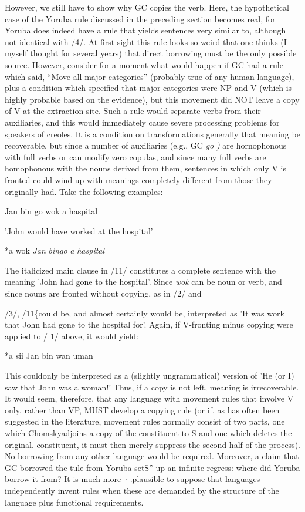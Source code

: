 However, we still have to show why GC copies the verb. Here, the hypothetical case of the Yoruba rule discussed in the preceding section becomes real, for Yoruba does indeed have a rule that yields sentences very similar to, although not identical with /4/. At first sight this rule looks so weird that one thinks (I myself thought for several years) that direct borrowing must be the only possible source. However, consider for a moment what would happen if GC had a rule which said, ``Move all major categories'' (probably true of any human lan\-guage), plus a condition which specified that major categories were NP and V (which is highly probable based on the evidence), but this movement did NOT leave a copy of V at the extraction site.
Such a rule would separate verbs from their auxiliaries, and this would immediately cause severe processing problems for speakers of creoles. It is a condition on transformations generally that meaning be recoverable, but since a number of auxiliaries (e.g., GC \textit{go} \textit{)} are hornoph\-onous with full verbs or can modify zero copulas, and since many full verbs are homophonous with the nouns derived from them, sentences in which only V is fronted could wind up with meanings completely different from those they originally had. Take the following examples:

\ea\label{ex:10}
 Jan bin go wok a haspital
\glt
\z

'John would have worked at the hospital'

\ea\label{ex:11}
 *a wok \textit{Jan} \textit{bi}\textit{n}\textit{go} \textit{a} \textit{haspital}
\glt
\z

The italicized main clause in /11/ constitutes a complete sentence with the meaning 'John had gone to the hospital'. Since \textit{wok} can be noun or verb, and since nouns are fronted without copying, as in /2/ and

/3/, /11\{could be, and almost certainly would be, interpreted as 'It was work that John had gone to the hospital for'. Again, if V-fronting minus copying were applied to / 1/ above, it would yield:

\ea\label{ex:12}
 *a sii Jan bin wan uman
\glt
\z

This couldonly be interpreted as a (slightly ungrammatical) version of 'He (or I) saw that John was a woman!' Thus, if a copy is not left, meaning is irrecoverable. It would seem, therefore, that any language with movement rules that involve V only, rather than VP, MUST de\-velop a copying rule (or if, as has often been suggested in the literature, movement rules normally consist of two parts, one which Chomsky\-adjoins a copy of the constituent to S and one which deletes the original. constituent, it must then merely suppress the second half of the process). No borrowing from any other language would be required. Moreover, a claim that GC borrowed the tule from Yoruba setS'' up an infinite regress: where did Yoruba borrow it from? It is much more ·.plausible to suppose that languages independently invent rules when these are demanded by the structure of the language plus func\-tional requirements.


